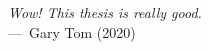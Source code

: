 
\vspace*{\fill}

\begin{epigraph}
\emph{Wow! This thesis is really good.} \\---~Gary Tom (2020)
\end{epigraph}




\vspace*{\fill}